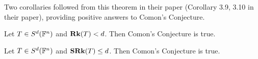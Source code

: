 \documentclass[../Lael_John_MasterThesis_Draft.tex]{subfiles}
\begin{document}
Two corollaries followed from this theorem in their paper (Corollary 3.9, 3.10 in their paper), providing positive answers to Comon's Conjecture.
\begin{corollary}
	Let $T \in S^d(\mathbb{F}^n)$ and $\textbf{Rk}(T) < d$. Then Comon's Conjecture is true.
\end{corollary}
\begin{corollary}
	Let $T \in S^d(\mathbb{F}^n)$ and $\textbf{SRk}(T) \leq d$. Then Comon's Conjecture is true.
\end{corollary}
\end{document}
